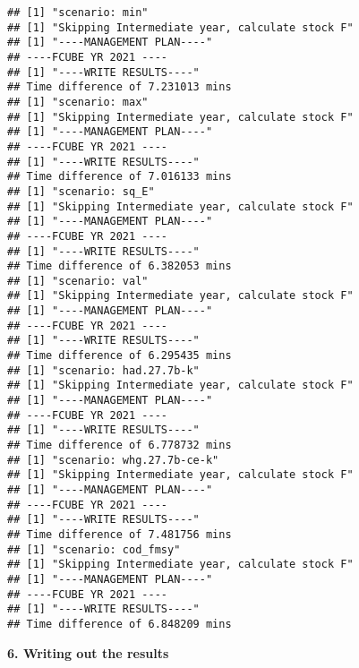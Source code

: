 \documentclass[
]{article}
\newenvironment{Shaded}{\begin{snugshade}}{\end{snugshade}}
\newcommand{\CommentTok}[1]{\textcolor[rgb]{0.56,0.35,0.01}{\textit{#1}}}
\newcommand{\KeywordTok}[1]{\textcolor[rgb]{0.13,0.29,0.53}{\textbf{#1}}}
\newcommand{\NormalTok}[1]{#1}
\newcommand{\OperatorTok}[1]{\textcolor[rgb]{0.81,0.36,0.00}{\textbf{#1}}}
\begin{document}
\begin{Shaded}
\begin{Highlighting}[]
{{{{{{{{{{{{\NormalTok{    \}}

    \KeywordTok{print}\NormalTok{(}\KeywordTok{Sys.time}\NormalTok{()}\OperatorTok{-}\NormalTok{t1)}
\NormalTok{\} }\CommentTok{#end of scenarios}
\end{Highlighting}
\end{Shaded}

\begin{verbatim}
## [1] "scenario: min"
## [1] "Skipping Intermediate year, calculate stock F"
## [1] "----MANAGEMENT PLAN----"
## ----FCUBE YR 2021 ---- 
## [1] "----WRITE RESULTS----"
## Time difference of 7.231013 mins
## [1] "scenario: max"
## [1] "Skipping Intermediate year, calculate stock F"
## [1] "----MANAGEMENT PLAN----"
## ----FCUBE YR 2021 ---- 
## [1] "----WRITE RESULTS----"
## Time difference of 7.016133 mins
## [1] "scenario: sq_E"
## [1] "Skipping Intermediate year, calculate stock F"
## [1] "----MANAGEMENT PLAN----"
## ----FCUBE YR 2021 ---- 
## [1] "----WRITE RESULTS----"
## Time difference of 6.382053 mins
## [1] "scenario: val"
## [1] "Skipping Intermediate year, calculate stock F"
## [1] "----MANAGEMENT PLAN----"
## ----FCUBE YR 2021 ---- 
## [1] "----WRITE RESULTS----"
## Time difference of 6.295435 mins
## [1] "scenario: had.27.7b-k"
## [1] "Skipping Intermediate year, calculate stock F"
## [1] "----MANAGEMENT PLAN----"
## ----FCUBE YR 2021 ---- 
## [1] "----WRITE RESULTS----"
## Time difference of 6.778732 mins
## [1] "scenario: whg.27.7b-ce-k"
## [1] "Skipping Intermediate year, calculate stock F"
## [1] "----MANAGEMENT PLAN----"
## ----FCUBE YR 2021 ---- 
## [1] "----WRITE RESULTS----"
## Time difference of 7.481756 mins
## [1] "scenario: cod_fmsy"
## [1] "Skipping Intermediate year, calculate stock F"
## [1] "----MANAGEMENT PLAN----"
## ----FCUBE YR 2021 ---- 
## [1] "----WRITE RESULTS----"
## Time difference of 6.848209 mins
\end{verbatim}

\textbf{6. Writing out the results}
\end{document}
